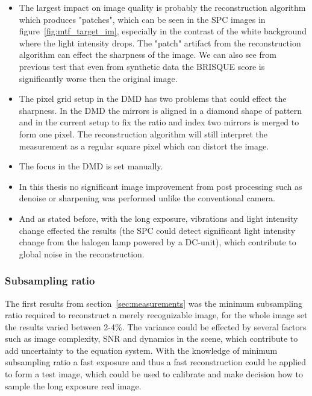 \begin{itemize}
\item The largest impact on image quality is probably the reconstruction algorithm which produces "patches", which can be seen in the SPC images in figure~\ref{fig:mtf_target_im}, especially in the contrast of the white background where the light intensity drops. The "patch" artifact from the reconstruction algorithm can effect the sharpness of the image. We can also see from previous test that even from synthetic data the BRISQUE score is significantly worse then the original image.

\item The pixel grid setup in the DMD has two problems that could effect the sharpness. In the DMD the mirrors is aligned in a diamond shape of pattern and in the current setup to fix the ratio and index two mirrors is merged to form one pixel. The reconstruction algorithm will still interpret the measurement as a regular square pixel which can distort the image.

\item The focus in the DMD is set manually.

\item In this thesis no significant image improvement from post processing such as denoise or sharpening was performed unlike the conventional camera.

\item And as stated before, with the long exposure, vibrations and light intensity change effected the results (the SPC could detect significant light intensity change from the halogen lamp powered by a DC-unit), which contribute to global noise in the reconstruction.

\end{itemize}



\subsubsection{Subsampling ratio}
The first results from section~\ref{sec:measurements} was the minimum subsampling ratio required to reconstruct a merely recognizable image, for the whole image set the results varied between 2-4\%. The variance could be effected by several factors such as image complexity, SNR and dynamics in the scene, which contribute to add uncertainty to the equation system. With the knowledge of minimum subsampling ratio a fast exposure and thus a fast reconstruction could be applied to form a test image, which could be used to calibrate and make decision how to sample the long exposure real image.\\[0.1in]

